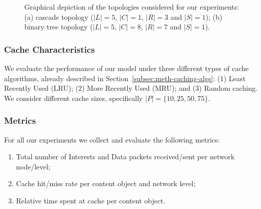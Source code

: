 \begin{figure}[h!]
    \centering


    \cprotect\caption{Graphical depiction of the topologies considered for 
        our experiments: (a) cascade topology ($|L| = 5$, $|C| = 1$, $|R| = 3$ 
        and $|S| = 1$); (b) binary tree topology 
        ($|L| = 5$, $|C| = 8$, $|R| = 7$ and $|S| = 1$).}
    \label{fig:exp-setup-nettop}

\end{figure}

\subsubsection{Cache Characteristics}
\label{subsec:exp-setup-cache}

We evaluate the performance of our model under three different types of cache 
algorithms, already described in Section~\ref{subsec:meth-caching-algs}: (1) 
Least Recently Used (LRU); (2) More Recently Used (MRU); and (3) Random caching. We 
consider different cache sizes, specifically $|P| = \{10, 25, 50, 75\}$.\shortvertbreak

\subsubsection{Metrics}
\label{subsec:exp-setup-metrics}

For all our experiments we collect and evaluate the following metrics:

\begin{enumerate}

    \item Total number of Interests and Data packets received\slash sent per network node\slash level;
    \item Cache hit\slash miss rate per content object and network level;
    \item Relative time spent at cache per content object.\shortvertbreak

\end{enumerate}

